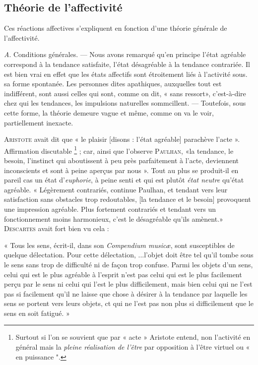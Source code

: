 \subsection{Théorie de l’affectivité}%
Ces réactions affectives s'expliquent
en fonction d’une théorie générale de l’affectivité.

{\it A}. Conditions générales. — Nous avons remarqué qu’en principe
l’état agréable correspond à la tendance satisfaite, l’état désagréable à
la tendance contrariée. Il est bien vrai en effet que les états affectifs
sont étroitement liés à l’activité sous. sa forme spontanée. Les personnes
dites apathiques, auxquelles tout est indifférent, sont aussi
celles qui sont, comme on dit, « sans ressort», c’est-à-dire chez qui
les tendances, les impulsions naturelles sommcillent. — Toutefois,
sous cette forme, la théorie demeure vague et même, comme on va
le voir, partiellement inexacte.

\textsc{Aristote} avait dit que « le plaisir [disons : l’état agréable] parachève l’acte ».
Affirmation discutable \footnote{Surtout si l’on se souvient que par « acte » Aristote entend, non l'activité en général
mais la {\it pleine réalisation de l'être} par opposition à l'être virtuel ou « en puissance ".} ;
car, ainsi que l’observe
\textsc{Paulhan}, «la tendance, le besoin, l'instinct qui aboutissent à peu
près parfaitement à l’acte, deviennent inconscients et sont à peine
aperçus par nous ». Tout au plus se produit-il en pareil cas un état
d’{\it euphorie}, à peine senti et qui est plutôt {\it état neutre} qu’état agréable.
« Légèrement contrariés, continue Paulhan, et tendant vers leur satisfaction
sans obstacles trop redoutables, [la tendance et le besoin] provoquent
une impression agréable. Plus fortement contrariés et tendant
vers un fonctionnement moins harmonieux, c’est le désagréable
qu’ils amènent.» \textsc{Descartes} avait fort bien vu cela :

{\footnotesize
« Tous les sens, écrit-il, dans son {\it Compendium musicæ}, sont susceptibles
de quelque délectation. Pour cette délectation, ...l’objet doit être tel qu'il
tombe sous le sens sans trop de difficulté ni de façon trop confuse. Parmi les
objets d’un sens, celui qui est le plus agréable à l'esprit n’est pas celui qui
est le plus facilement perçu par le sens ni celui qui l’est le plus difficilement,
mais bien celui qui ne l’est pas si facilement qu'il ne laisse que chose à
désirer à la tendance par laquelle les sens se portent vers leurs objets, ct
qui ne l’est pas non plus si difficilement que le sens en soit fatigué. »
}

